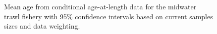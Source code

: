 \documentclass[
]{scrartcl}
\begin{document}
\begin{figure}[H]


\caption{\label{fig-midwater-mean-caal}Mean age from conditional
age-at-length data for the midwater trawl fishery with 95\% confidence
intervals based on current samples sizes and data weighting.}

\end{figure}%
\end{document}
